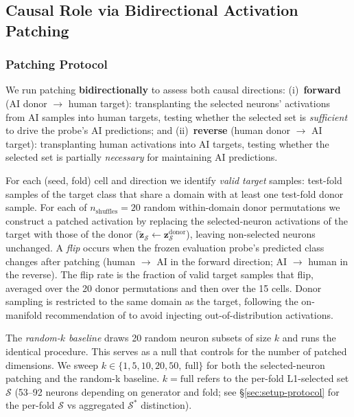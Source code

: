 \documentclass[11pt]{article}
\begin{document}
\subsection{Causal Role via Bidirectional Activation Patching}
\label{sec:results-patching}

\subsubsection{Patching Protocol}
\label{sec:patching-protocol}

We run patching \textbf{bidirectionally} to assess both causal directions: (i)~\textbf{forward} (AI donor $\to$ human target): transplanting the selected neurons' activations from AI samples into human targets, testing whether the selected set is \textit{sufficient} to drive the probe's AI predictions; and (ii)~\textbf{reverse} (human donor $\to$ AI target): transplanting human activations into AI targets, testing whether the selected set is partially \textit{necessary} for maintaining AI predictions.

For each (seed, fold) cell and direction we identify \textit{valid target} samples: test-fold samples of the target class that share a domain with at least one test-fold donor sample. For each of $n_{\text{shuffles}} = 20$ random within-domain donor permutations we construct a patched activation by replacing the selected-neuron activations of the target with those of the donor ($\tilde{\mathbf{z}}_{\mathcal{S}} \!\leftarrow\! \mathbf{z}^{\text{donor}}_{\mathcal{S}}$), leaving non-selected neurons unchanged. A \textit{flip} occurs when the frozen evaluation probe's predicted class changes after patching (human $\to$ AI in the forward direction; AI $\to$ human in the reverse). The flip rate is the fraction of valid target samples that flip, averaged over the 20 donor permutations and then over the 15 cells. Donor sampling is restricted to the same domain as the target, following the on-manifold recommendation of \citet{heimersheim2024patching} to avoid injecting out-of-distribution activations.

The \textit{random-$k$ baseline} draws 20 random neuron subsets of size $k$ and runs the identical procedure. This serves as a null that controls for the number of patched dimensions. We sweep $k \in \{1, 5, 10, 20, 50,\ \text{full}\}$ for both the selected-neuron patching and the random-k baseline. $k = \text{full}$ refers to the per-fold L1-selected set $\mathcal{S}$ (53--92 neurons depending on generator and fold; see §\ref{sec:setup-protocol} for the per-fold $\mathcal{S}$ vs aggregated $\mathcal{S}^{*}$ distinction).
\end{document}
